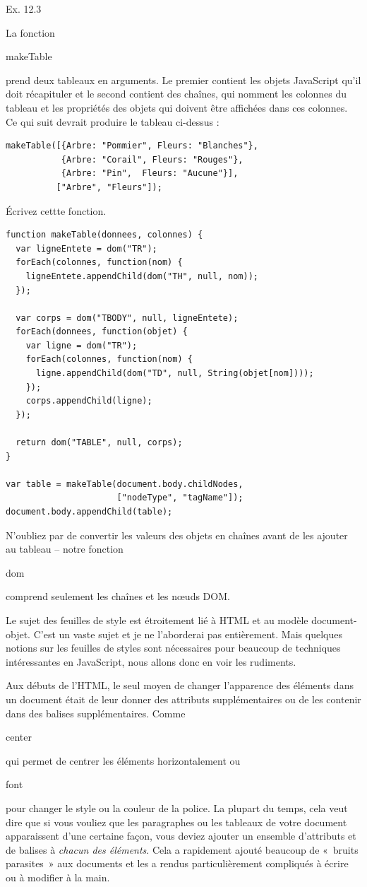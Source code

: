 \documentclass{FramateX}
\renewcommand{\texttt}[1]{\begin{sffamily}{#1}\end{sffamily}}
\begin{document}
\begin{center}\end{center}

Ex. 12.3

La fonction \texttt{makeTable} prend deux tableaux en arguments. Le
premier contient les objets JavaScript qu'il doit récapituler et le
second contient des chaînes, qui nomment les colonnes du tableau et les
propriétés des objets qui doivent être affichées dans ces colonnes. Ce
qui suit devrait produire le tableau ci-dessus :

\begin{lstlisting}
makeTable([{Arbre: "Pommier", Fleurs: "Blanches"},
           {Arbre: "Corail", Fleurs: "Rouges"},
           {Arbre: "Pin",  Fleurs: "Aucune"}],
          ["Arbre", "Fleurs"]);
\end{lstlisting}
Écrivez cettte fonction.

\begin{lstlisting}
function makeTable(donnees, colonnes) {
  var ligneEntete = dom("TR");
  forEach(colonnes, function(nom) {
    ligneEntete.appendChild(dom("TH", null, nom));
  });

  var corps = dom("TBODY", null, ligneEntete);
  forEach(donnees, function(objet) {
    var ligne = dom("TR");
    forEach(colonnes, function(nom) {
      ligne.appendChild(dom("TD", null, String(objet[nom])));
    });
    corps.appendChild(ligne);
  });

  return dom("TABLE", null, corps);
}

var table = makeTable(document.body.childNodes,
                      ["nodeType", "tagName"]);
document.body.appendChild(table);
\end{lstlisting}
N'oubliez par de convertir les valeurs des objets en chaînes avant de
les ajouter au tableau -- notre fonction \texttt{dom} comprend seulement
les chaînes et les nœuds DOM.

\begin{center}\end{center}

Le sujet des feuilles de style est étroitement lié à HTML et au modèle
document-objet. C'est un vaste sujet et je ne l'aborderai pas
entièrement. Mais quelques notions sur les feuilles de styles sont
nécessaires pour beaucoup de techniques intéressantes en JavaScript,
nous allons donc en voir les rudiments.

Aux débuts de l'HTML, le seul moyen de changer l'apparence des éléments
dans un document était de leur donner des attributs supplémentaires ou
de les contenir dans des balises supplémentaires. Comme \texttt{center}
qui permet de centrer les éléments horizontalement ou \texttt{font} pour
changer le style ou la couleur de la police. La plupart du temps, cela
veut dire que si vous vouliez que les paragraphes ou les tableaux de
votre document apparaissent d'une certaine façon, vous deviez ajouter un
ensemble d'attributs et de balises à \emph{chacun des éléments}. Cela a
rapidement ajouté beaucoup de «~bruits parasites~» aux documents et les
a rendus particulièrement compliqués à écrire ou à modifier à la main.
\end{document}
